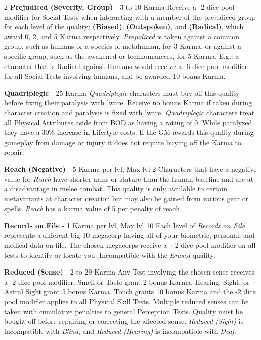 \documentclass[
  oneside]{article}
\begin{document}
\begin{multicols}{2}
\textbf{Prejudiced (Severity, Group)} - 3 to 10
Karma Receive a -2 dice pool modifier for Social
Tests when interacting with a member of the
prejudiced group for each level of the quality;
\textbf{(Biased)}, \textbf{(Outspoken)}, and
\textbf{(Radical)}, which award 0, 2, and 5 Karma
respectively. \emph{Prejudiced} is taken against a
common group, such as humans or a species of
metahuman, for 3 Karma, or against a specific
group, such as the awakened or technomancers, for
5 Karma. E.g.: a character that is Radical against
Humans would receive a -6 dice pool modifier for
all Social Tests involving humans, and be awarded
10 bonus Karma.

\textbf{Quadriplegic} - 25 Karma
\emph{Quadriplegic} characters must buy off this
quality before fixing their paralysis with 'ware.
Receive no bonus Karma if taken during character
creation and paralysis is fixed with 'ware.
\emph{Quadriplegic} characters treat all Physical
Attributes aside from BOD as having a rating of 0.
While paralyzed they have a 30\% increase in
Lifestyle costs. If the GM awards this quality
during gameplay from damage or injury it does not
require buying off the Karma to repair.

\textbf{Reach (Negative)} - 5 Karma per lvl, Max
lvl 2 Characters that have a negative value for
\emph{Reach} have shorter arms or stature than the
human baseline and are at a disadvantage in melee
combat. This quality is only available to certain
metavariants at character creation but may also be
gained from various gear or spells. \emph{Reach}
has a karma value of 5 per penalty of reach.

\textbf{Records on File} - 1 Karma per lvl, Max
lvl 10 Each level of \emph{Records on File}
represents a different big 10 megacorp having all
of your biometric, personal, and medical data on
file. The chosen megacorps receive a +2 dice pool
modifier on all tests to identify or locate you.
Incompatible with the \emph{Erased} quality.

\textbf{Reduced (Sense)} - 2 to 29 Karma Any Test
involving the chosen sense receives a -2 dice pool
modifier. Smell or Taste grant 2 bonus Karma.
Hearing, Sight, or Astral Sight grant 5 bonus
Karma. Touch grants 10 bonus Karma and the -2 dice
pool modifier applies to all Physical Skill Tests.
Multiple reduced senses can be taken with
cumulative penalties to general Perception Tests.
Quality must be bought off before repairing or
correcting the affected sense. \emph{Reduced
(Sight)} is incompatible with \emph{Blind}, and
\emph{Reduced (Hearing)} is incompatible with
\emph{Deaf}.


\end{multicols}
\end{document}

